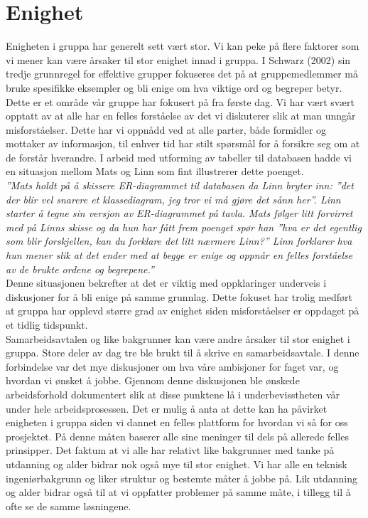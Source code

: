 \section{Enighet}
Enigheten i gruppa har generelt sett vært stor. Vi kan peke på flere faktorer som vi mener kan være årsaker til stor enighet innad i gruppa. I Schwarz (2002) \cite{fasilitator} sin tredje grunnregel for effektive grupper fokuseres det på at gruppemedlemmer må bruke spesifikke eksempler og bli enige om hva viktige ord og begreper betyr. Dette er et område vår gruppe har fokusert på fra første dag. Vi har vært svært opptatt av at alle har en felles forståelse av det vi diskuterer slik at man unngår misforståelser. Dette har vi oppnådd ved at alle parter, både formidler og mottaker av informasjon, til enhver tid har stilt spørsmål for å forsikre seg om at de forstår hverandre. I arbeid med utforming av tabeller til databasen hadde vi en situasjon mellom Mats og Linn som fint illustrerer dette poenget.\\

\textit{''Mats holdt på å skissere ER-diagrammet til databasen da Linn bryter inn: ''det der blir vel snarere et klassediagram, jeg tror vi må gjøre det sånn her''. Linn starter å tegne sin versjon av ER-diagrammet på tavla. Mats følger litt forvirret med på Linns skisse og da hun har fått frem poenget spør han ''hva er det egentlig som blir forskjellen, kan du forklare det litt nærmere Linn?'' Linn forklarer hva hun mener slik at det ender med at begge er enige og oppnår en felles forståelse av de brukte ordene og begrepene.''}\\

Denne situasjonen bekrefter at det er viktig med oppklaringer underveis i diskusjoner for å bli enige på samme grunnlag. Dette fokuset har trolig medført at gruppa har opplevd større grad av enighet siden misforståelser er oppdaget på et tidlig tidspunkt.\\

Samarbeidsavtalen og like bakgrunner kan være andre årsaker til stor enighet i gruppa. Store deler av dag tre ble brukt til å skrive en samarbeidsavtale. I denne forbindelse var det mye diskusjoner om hva våre ambisjoner for faget var, og hvordan vi ønsket å jobbe. Gjennom denne diskusjonen ble ønskede arbeidsforhold dokumentert slik at disse punktene lå i underbevisstheten vår under hele arbeidsprosessen. Det er mulig å anta at dette kan ha påvirket enigheten i gruppa siden vi dannet en felles plattform for hvordan vi så for oss prosjektet. På denne måten baserer alle sine meninger til dels på allerede felles prinsipper. Det faktum at vi alle har relativt like bakgrunner med tanke på utdanning og alder bidrar nok også mye til stor enighet. Vi har alle en teknisk ingeniørbakgrunn og liker struktur og bestemte måter å jobbe på. Lik utdanning og alder bidrar også til at vi oppfatter problemer på samme måte, i tillegg til å ofte se de samme løsningene.\\

